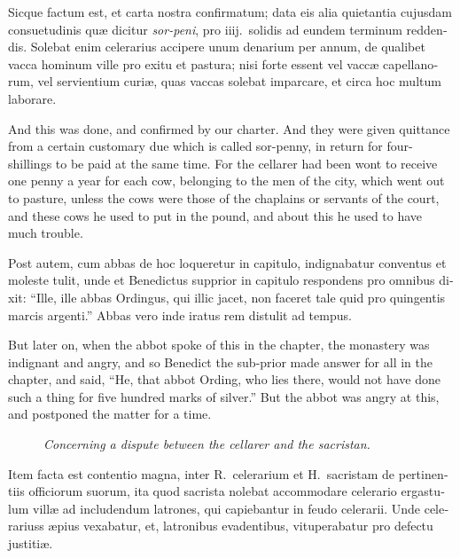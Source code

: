 \documentclass{book}
\newcommand{\blockhead}[4][]{
\begin{figure}
\centering
\vspace{#4}
\parbox{2.75cm}{\begin{center}\footnotesize \color{BrickRed} \emph{#2}\\ #1 \end{center}}
\end{figure}
}
\begin{document}
\begin{paracol}{2}
\switchcolumn*

\begin{otherlanguage}{latin}
Sicque factum est, et carta nostra confirmatum; data eis alia quietantia cujusdam consuetudinis qu\ae{} dicitur \emph{sor-peni}, pro iiij.\ solidis ad eundem terminum reddendis. Solebat enim celerarius accipere unum denarium per annum, de qualibet vacca hominum ville pro exitu et pastura; nisi forte essent vel vacc\ae{} capellanorum, vel servientium curi\ae{}, quas vaccas solebat imparcare, et circa hoc multum laborare. 
\end{otherlanguage}

\switchcolumn

And this was done, and confirmed by our charter. And they were given quittance from a certain customary due which is called sor-penny, in return for four-shillings to be paid at the same time. For the cellarer had been wont to receive one penny a year for each cow, belonging to the men of the city, which went out to pasture, unless the cows were those of the chaplains or servants of the court, and these cows he used to put in the pound, and about this he used to have much trouble.

\switchcolumn*

\begin{otherlanguage}{latin}
Post autem, cum abbas de hoc loqueretur in capitulo, indignabatur conventus et moleste tulit, unde et Benedictus supprior in capitulo respondens pro omnibus dixit: ``Ille, ille abbas Ordingus, qui illic jacet, non faceret tale quid pro quingentis marcis argenti.'' Abbas vero inde iratus rem distulit ad tempus. 
\end{otherlanguage}

\switchcolumn

But later on, when the abbot spoke of this in the chapter, the monastery was indignant and angry, and so Benedict the sub-prior made answer for all in the chapter, and said, ``He, that abbot Ording, who lies there, would not have done such a thing for five hundred marks of silver.'' But the abbot was angry at this, and postponed the matter for a time.

\switchcolumn*

\begin{otherlanguage}{latin}
\blockhead{Concerning a dispute between the cellarer and the sacristan.}{4}{-.5cm}
Item facta est contentio magna, inter R.\ celerarium et H.\ sacristam de pertinentiis officiorum suorum, ita quod sacrista nolebat accommodare celerario ergastulum vill\ae{} ad includendum latrones, qui capiebantur in feudo celerarii. Unde celerariuss \ae{}pius vexabatur, et, latronibus evadentibus, vituperabatur pro defectu justiti\ae{}.


\end{otherlanguage}
\end{paracol}
\end{document}
